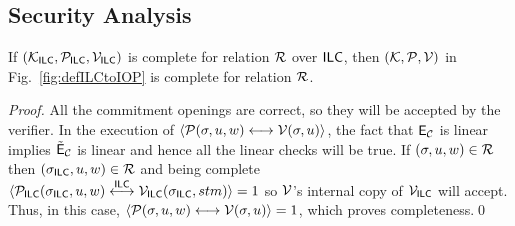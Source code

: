 \subsection{Security Analysis}
\label{sec:IPCPsec}
    \begin{theorem}[Completeness]
    If $(\mathcal{K}_{\mathsf{ILC}},\mathcal{P}_{\mathsf{ILC}},\mathcal{V}_{\mathsf{ILC}})$ is complete for relation $\mathcal{R}$ over $\mathsf{ILC}$, then $(\mathcal{K},\mathcal{P},\mathcal{V})$ in Fig.~\ref{fig:defILCtoIOP} is complete for relation $\mathcal{R}$.
    \end{theorem}  
   \begin{proof}
All the commitment openings are correct, so they will be accepted by the verifier. In the execution of $\langle \mathcal{P}(\mathsf{\sigma},u,w)\longleftrightarrow\mathcal{V}(\mathsf{\sigma},u)\rangle$, the fact that $\mathsf{E}_{\mathcal{C}}$ is linear implies $\tilde{\mathsf{E}}_{\mathcal{C}}$ is linear and hence all the linear checks will be true. If $(\mathsf{\sigma},u,w)\in \mathcal{R}$ then $(\mathsf{\sigma}_{\mathsf{ILC}},u,w)\in \mathcal{R}$ and being complete $\langle \mathcal{P}_{\mathsf{ILC}}(\mathsf{\sigma}_{\mathsf{ILC}},u,w)\overset{\mathsf{ILC}}{\longleftrightarrow}\mathcal{V}_{\mathsf{ILC}}(\mathsf{\sigma}_{\mathsf{ILC}},stm)\rangle =1$ so $\mathcal{V}$'s internal copy of $\mathcal{V}_{\mathsf{ILC}}$ will accept. Thus, in this case, $\langle \mathcal{P}(\mathsf{\sigma},u,w)\longleftrightarrow\mathcal{V}(\mathsf{\sigma},u)\rangle=1$, which proves completeness.\qed
    \end{proof}
  
